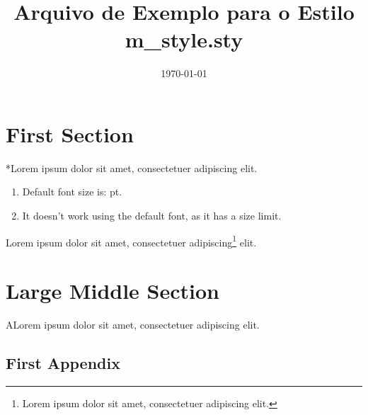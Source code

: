 \documentclass[twocolumn,10pt]{article}
\title{Arquivo de Exemplo para o Estilo m\_style.sty}
\date{\today}
\begin{document}
\maketitle


\blindtext

\section*{First Section}
*Lorem ipsum dolor sit amet, consectetuer adipiscing elit.
\blindtext

\begin{enumerate}
    \item Default font size is: \makeatletter\f@size\makeatother pt.
    
    \item It doesn't work using the default font, as it has a size limit.
\end{enumerate}    

\blindtext

Lorem ipsum dolor sit amet, consectetuer adipiscing\footnote{Lorem ipsum dolor sit amet, consectetuer adipiscing elit.} elit.
\blindtext



\blindtext\blindtext

\section*{Large Middle Section}
ALorem ipsum dolor sit amet, consectetuer\cite{texbook} adipiscing elit.
\blindtext

\blindtext

\blindtext

\blindtext

\onecolumn

\pagestyle{empty}



\begin{appendixenv}[Appendix]
    \section{First Appendix} \label{apx:first-appendix}

    \blindtext
\end{appendixenv}
\end{document}
